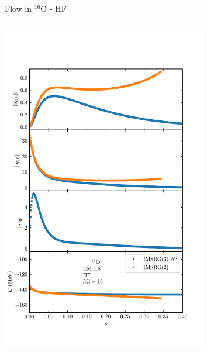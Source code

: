 \documentclass[aspectratio=169]{beamer}
\begin{document}
\begin{frame}{Flow in ${}^{16}\text{O}$ - HF}
  \begin{columns}
    \begin{column}{0.5\textwidth}
      \begin{center}
        \includegraphics[trim=0 1.0cm 0 1.5cm, clip, width=0.7\textwidth]{thesis/talk/images/oxygen_flow_imsrg2_and_3_eta.pdf}
      \end{center}
    \end{column}
    \begin{column}{0.5\textwidth}
      \begin{center}

\end{center}
\end{column}
\end{columns}
\end{frame}
\end{document}
